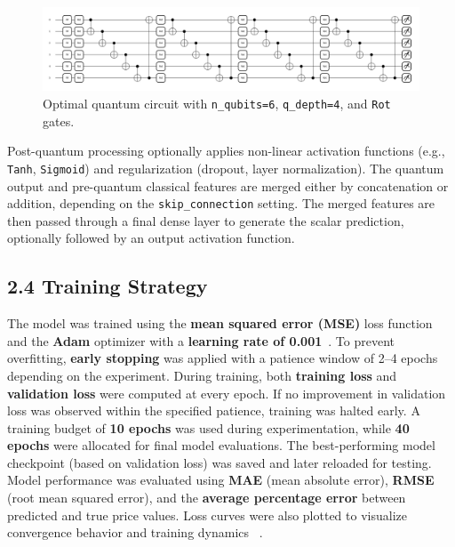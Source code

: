 \documentclass[10pt]{article}
\begin{document}
\begin{figure}[h!]
    \centering
    \vspace{-0.8em}
    \includegraphics[trim=0.0cm 0cm 0cm 0cm,clip,width=0.7\paperwidth]{images/quantum circuit 6 4 3.png}
    \caption{Optimal quantum circuit with \texttt{n\_qubits=6}, \texttt{q\_depth=4}, and \texttt{Rot} gates.}
    \label{fig:final quantum circuit}
    \vspace{-0.6em}
\end{figure}

Post-quantum processing optionally applies non-linear activation functions (e.g., \texttt{Tanh}, \texttt{Sigmoid}) and regularization (dropout, layer normalization). The quantum output and pre-quantum classical features are merged either by concatenation or addition, depending on the \texttt{skip\_connection} setting. The merged features are then passed through a final dense layer to generate the scalar prediction, optionally followed by an output activation function.


\subsection*{2.4 Training Strategy}

The model was trained using the \textbf{mean squared error (MSE)} loss function and the \textbf{Adam} optimizer with a \textbf{learning rate of 0.001}~\cite{goodfellow2016deep}. To prevent overfitting, \textbf{early stopping} was applied with a patience window of 2–4 epochs depending on the experiment. During training, both \textbf{training loss} and \textbf{validation loss} were computed at every epoch. If no improvement in validation loss was observed within the specified patience, training was halted early. A training budget of \textbf{10 epochs} was used during experimentation, while \textbf{40 epochs} were allocated for final model evaluations. The best-performing model checkpoint (based on validation loss) was saved and later reloaded for testing. Model performance was evaluated using \textbf{MAE} (mean absolute error), \textbf{RMSE} (root mean squared error), and the \textbf{average percentage error} between predicted and true price values. Loss curves were also plotted to visualize convergence behavior and training dynamics ~\cite{goodfellow2016deep}.
\end{document}

